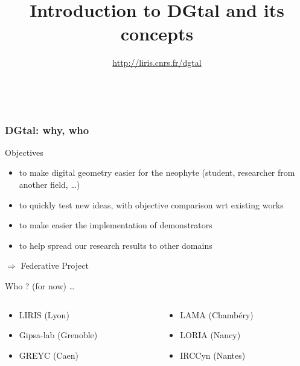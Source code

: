 \documentclass[8pt]{beamer}
\title[DGtal Meeting 2012]{Introduction to  DGtal and its concepts}
\subtitle{\url{http://liris.cnrs.fr/dgtal}}
\author{~}
\begin{document}
\small






\begin{frame}[plain]
  \titlepage
\end{frame}

\begin{frame}%
  \frametitle{DGtal: why, who}
  
  \small
  \begin{block}{Objectives}
    \small
    \begin{itemize}
    \item to make digital geometry easier for the neophyte (student,
      researcher from another field, \ldots)
    \item to quickly test  new ideas, with objective comparison wrt
      existing works
    \item to make easier the implementation of demonstrators
    \item to help spread our research results to other domains
    \end{itemize}
  \end{block}
  
\alert{$\Rightarrow$ Federative Project}
  
  \small
  \begin{block}{Who ? (for now) \ldots}
    \small
    \begin{columns}
      \begin{column}{0.45\textwidth}
        \begin{itemize}
        \item LIRIS (Lyon)      
        \item Gipsa-lab (Grenoble)
        \item GREYC (Caen)
        \end{itemize}
      \end{column}
      \begin{column}{0.45\textwidth}
        \begin{itemize}
        \item LAMA (Chambéry)
        \item LORIA (Nancy)
        \item IRCCyn (Nantes)
        \end{itemize}
      \end{column}
    \end{columns}
  \end{block}
\end{frame}
\end{document}
